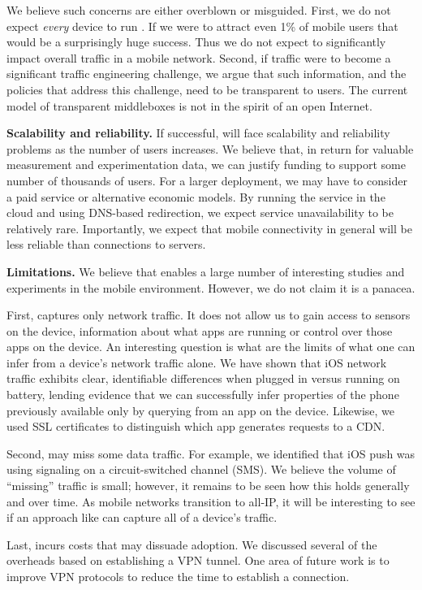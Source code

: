 We believe such concerns are either overblown or misguided. First, we do not 
expect \emph{every} device to run \meddle. If we were to attract even 1\% of 
mobile users that would be a surprisingly huge success. Thus we do not expect 
\meddle to significantly impact overall traffic in a mobile network. Second, if \meddle 
traffic were to become a significant traffic engineering challenge, we argue that 
such information, and the policies that address this challenge, need to be 
transparent to users. The current model of transparent middleboxes is not 
in the spirit of an open Internet.

\noindent\textbf{Scalability and reliability.} If successful, \meddle will 
face scalability and reliability problems as the number of users increases. 
We believe that, in return for valuable measurement and experimentation data, 
we can justify funding to support some number of thousands of users. For a 
larger deployment, we may have to consider a paid service or alternative 
economic models. By running the service in the cloud and using DNS-based 
redirection, we expect service unavailability to be relatively rare. Importantly, 
we expect that mobile connectivity in general will be less reliable than connections 
to \meddle servers.

\noindent\textbf{Limitations.} We believe that \meddle enables a large number 
of interesting studies and experiments in the mobile environment. However, we 
do not claim it is a panacea. 

First, \meddle captures only network traffic. It does 
not allow us to gain access to sensors on the device, information about what 
apps are running or control over those apps on the device. An interesting question 
is what are the limits of what one can infer from a device's network traffic alone. 
We have shown that iOS network traffic exhibits clear, identifiable differences 
when plugged in versus running on battery, lending evidence that we can successfully 
infer properties of the phone previously available only by querying from an app 
on the device. Likewise, we used SSL certificates to distinguish which app generates 
requests to a CDN.

Second, \meddle may miss some data traffic. For example, we identified that 
iOS push was using signaling on a circuit-switched channel (SMS). We believe 
the volume of ``missing'' traffic is small; however, it remains to be seen how 
this holds generally and over time. As mobile networks transition to all-IP, it will 
be interesting to see if an approach like \meddle can capture all of a device's traffic.

Last, \meddle incurs costs that may dissuade adoption. We discussed several of the 
overheads based on establishing a VPN tunnel. One area of future work is to improve 
VPN protocols to reduce the time to establish a connection. 
